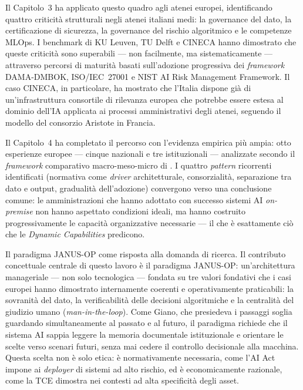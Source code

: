 Il Capitolo~3 ha applicato questo quadro agli atenei europei, identificando quattro
criticità strutturali negli atenei italiani medi: la governance del dato, la
certificazione di sicurezza, la governance del rischio algoritmico e le competenze
MLOps. I benchmark di KU Leuven, TU Delft e CINECA hanno dimostrato che queste
criticità sono superabili --- non facilmente, ma sistematicamente --- attraverso
percorsi di maturità basati sull'adozione progressiva dei \textit{framework}
DAMA-DMBOK, ISO/IEC~27001 e NIST AI Risk Management Framework. Il caso CINECA,
in particolare, ha mostrato che l'Italia dispone già di un'infrastruttura consortile
di rilevanza europea che potrebbe essere estesa al dominio dell'IA applicata ai
processi amministrativi degli atenei, seguendo il modello del consorzio Aristote
in Francia.

Il Capitolo~4 ha completato il percorso con l'evidenza empirica più ampia: otto
esperienze europee --- cinque nazionali e tre istituzionali --- analizzate secondo
il \textit{framework} comparativo macro-meso-micro di
\textcite{ValleCruzMacroMesoMicro2024}. I quattro \textit{pattern} ricorrenti
identificati (normativa come \textit{driver} architetturale, consorzialità, separazione tra dato e output, gradualità dell'adozione)
convergono verso una conclusione comune: le amministrazioni che hanno adottato
con successo sistemi AI \textit{on-premise} non hanno aspettato condizioni ideali,
ma hanno costruito progressivamente le capacità organizzative necessarie ---
il che è esattamente ciò che le \textit{Dynamic Capabilities} predicono.

\medskip

Il paradigma JANUS-OP come risposta alla domanda di ricerca.
Il contributo concettuale centrale di questo lavoro è il paradigma JANUS-OP:
un'architettura manageriale --- non solo tecnologica --- fondata su tre valori
fondativi che i casi europei hanno dimostrato internamente coerenti e operativamente
praticabili: la sovranità del dato, la verificabilità delle
decisioni algoritmiche e la centralità del giudizio umano (\textit{man-in-the-loop}).
Come Giano, che presiedeva i passaggi soglia guardando simultaneamente al passato e al
futuro, il paradigma richiede che il sistema AI sappia leggere la memoria
documentale istituzionale e orientare le scelte verso scenari futuri, senza mai
cedere il controllo decisionale alla macchina. Questa scelta non è solo etica: è
normativamente necessaria, come l'AI Act impone ai \textit{deployer} di sistemi
ad alto rischio, ed è economicamente razionale, come la TCE dimostra nei contesti
ad alta specificità degli asset.


